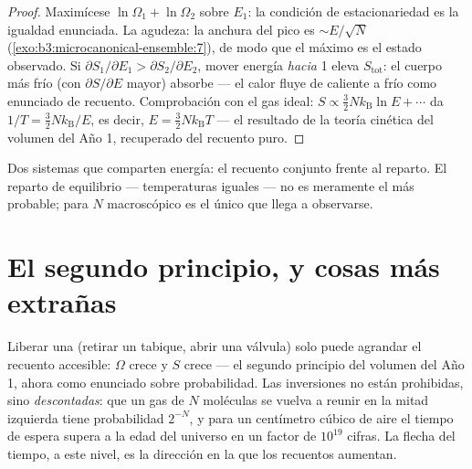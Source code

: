 \begin{proof}
Maximícese $\ln\Omega_1 + \ln\Omega_2$ sobre $E_1$: la condición de
estacionariedad es la igualdad enunciada. La agudeza: la anchura del pico es
$\sim E/\sqrt N$ (\cref{exo:b3:microcanonical-ensemble:7}), de modo que el
máximo es el estado observado. Si $\partial S_1/\partial E_1 >
\partial S_2/\partial E_2$, mover energía \emph{hacia} 1 eleva
$S_{\text{tot}}$: el cuerpo más frío (con $\partial S/\partial E$ mayor)
absorbe --- el calor fluye de caliente a frío como enunciado de recuento.
Comprobación con el gas ideal: $S \propto \tfrac32 Nk_{\text{B}}\ln E + \cdots$
da $1/T = \tfrac32 Nk_{\text{B}}/E$, es decir, $E = \tfrac32
Nk_{\text{B}}T$ --- el resultado de la teoría cinética del volumen del Año 1,
recuperado del recuento puro.
\end{proof}

\begin{omfigure}

{\small Dos sistemas que comparten energía: el recuento conjunto frente al
reparto. El reparto de equilibrio --- temperaturas iguales --- no es
meramente el más probable; para $N$ macroscópico es el único que llega a
observarse.}
\end{omfigure}

\section{El segundo principio, y cosas más extrañas}

\begin{proposition}\label{prop:b3:microcanonical-ensemble:second-law}
Liberar una  (retirar un tabique, abrir una válvula) solo puede
agrandar el recuento accesible: $\Omega$ crece y $S$ crece --- el
segundo principio del volumen del Año 1, ahora como enunciado sobre
probabilidad. Las inversiones no están prohibidas, sino \emph{descontadas}:
que un gas de $N$ moléculas se vuelva a reunir en la mitad izquierda tiene
probabilidad $2^{-N}$, y para un centímetro cúbico de aire el tiempo de
espera supera a la edad del universo en un factor de $10^{19}$ cifras.
La flecha del tiempo, a este nivel, es la dirección en la que los recuentos
aumentan.
\end{proposition}

